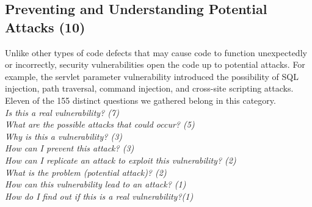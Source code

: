 \documentclass[conference]{IEEEtran}
\begin{document}








\noindent\subsection{\textbf{Preventing and Understanding Potential Attacks (10)}}\label{pupa}
Unlike other types of code defects that may cause code to function unexpectedly or incorrectly, security vulnerabilities open the code up to potential attacks. For example, the servlet parameter vulnerability introduced the possibility of SQL injection, path traversal, command injection, and cross-site scripting attacks.
Eleven of the 155 distinct questions we gathered belong in this category.
\\

\noindent\emph{Is this a real vulnerability? (7)} \\
\emph{What are the possible attacks that could occur? (5)} \\
\emph{Why is this a vulnerability? (3)} \\
\emph{How can I prevent this attack? (3)} \\
\emph{How can I replicate an attack to exploit this vulnerability? (2)} \\
\emph{What is the problem (potential attack)? (2)} \\
\emph{How can this vulnerability lead to an attack? (1)} \\
\emph{How do I find out if this is a real vulnerability?(1)} \\
\end{document}
